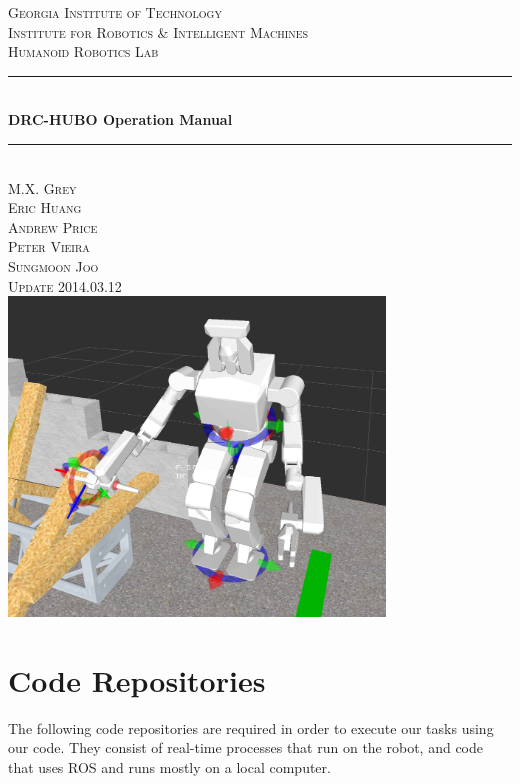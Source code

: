 \documentclass[letterpaper, 10 pt]{report}
\begin{document}
\begin{titlepage}
\center
\textsc{\LARGE Georgia Institute of Technology}\\[1.5cm]
\textsc{\large Institute for Robotics \& Intelligent Machines}\\[0.5cm]
\textsc{\large Humanoid Robotics Lab}\\[0.5cm]
\rule{\linewidth}{0.5mm}\\[0.4cm]
{\huge \bfseries DRC-HUBO Operation Manual}\\[0.4cm]
\rule{\linewidth}{0.5mm}\\[1.5cm]
\textsc{\normalsize M.X. Grey}\\
\textsc{\normalsize Eric Huang}\\
\textsc{\normalsize Andrew Price}\\
\textsc{\normalsize Peter Vieira}\\
\textsc{\normalsize Sungmoon Joo}\\[0.5cm]
\textsc{\normalsize Update 2014.03.12}\\[0.5cm]
\includegraphics[width=10.0cm]{figures/hubo_keypose_1.png}
\vfill
\end{titlepage}


\tableofcontents
\newpage


%
\chapter{Code Repositories}\label{chap:code-repos}
The following code repositories are required in order to execute our tasks using our code. They consist of real-time processes that run on the robot, and code that uses ROS and runs mostly on a local computer.
\end{document}
